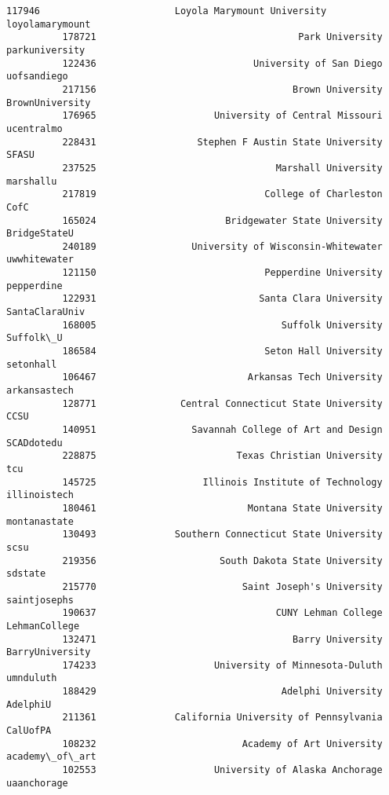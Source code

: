 \documentclass[11pt]{article}
\begin{document}
\begin{Verbatim}[commandchars=\\\{\}]
          117946                        Loyola Marymount University  loyolamarymount   
          178721                                    Park University   parkuniversity   
          122436                            University of San Diego      uofsandiego   
          217156                                   Brown University  BrownUniversity   
          176965                     University of Central Missouri       ucentralmo   
          228431                  Stephen F Austin State University            SFASU   
          237525                                Marshall University        marshallu   
          217819                              College of Charleston             CofC   
          165024                       Bridgewater State University     BridgeStateU   
          240189                 University of Wisconsin-Whitewater     uwwhitewater   
          121150                              Pepperdine University       pepperdine   
          122931                             Santa Clara University   SantaClaraUniv   
          168005                                 Suffolk University        Suffolk\_U   
          186584                              Seton Hall University        setonhall   
          106467                           Arkansas Tech University     arkansastech   
          128771               Central Connecticut State University             CCSU   
          140951                 Savannah College of Art and Design       SCADdotedu   
          228875                         Texas Christian University              tcu   
          145725                   Illinois Institute of Technology     illinoistech   
          180461                           Montana State University     montanastate   
          130493              Southern Connecticut State University             scsu   
          219356                      South Dakota State University          sdstate   
          215770                          Saint Joseph's University     saintjosephs   
          190637                                CUNY Lehman College    LehmanCollege   
          132471                                   Barry University  BarryUniversity   
          174233                     University of Minnesota-Duluth        umnduluth   
          188429                                 Adelphi University         AdelphiU   
          211361              California University of Pennsylvania         CalUofPA   
          108232                          Academy of Art University   academy\_of\_art   
          102553                     University of Alaska Anchorage      uaanchorage   

\end{Verbatim}
\end{document}
